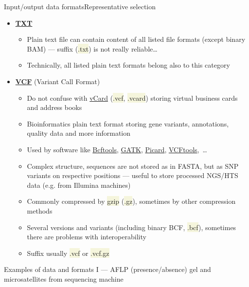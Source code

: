 \documentclass[compress, ucs, xelatex, 11pt, xcolor=svgnames, aspectratio=169,
	hyperref={
		bookmarks=true,
		unicode=true,
		colorlinks=true,
		pdftitle={Molecular data in R},
		plainpages=false,
		pdfauthor={Vojtech Zeisek},
		pdfsubject={Course about phylogeny and evolution in R},
		pdfcreator={XeLaTeX},
		pdfkeywords={R, evolution, phylogeny, molecular data},
		linkcolor=Crimson, %
		anchorcolor=Magenta, %
		citecolor=Magenta, %
		filecolor=Magenta, %
		menucolor=Magenta, %
		urlcolor=DodgerBlue, %
		pdftex},
	url={hyphens, lowtilde} %
	]{beamer}
\renewcommand{\texttt}[1]{\colorbox{Beige}{{\ttfamily #1}}}
\begin{document}
\begin{frame}[allowframebreaks]{Input/output data formats}{Representative selection}
\begin{itemize}
		\item \href{https://en.wikipedia.org/wiki/Text_file}{\textbf{TXT}}
		\begin{itemize}
			\item Plain text file can contain content of all listed file formats (except binary BAM) --- suffix (\texttt{*.txt}) is not really reliable\ldots
			\item Technically, all listed plain text formats belong also to this category
		\end{itemize}
		\item \href{https://en.wikipedia.org/wiki/Variant_Call_Format}{\textbf{VCF}} (Variant Call Format)
		\begin{itemize}
			\item Do not confuse with \href{https://en.wikipedia.org/wiki/VCard}{vCard} (\texttt{*.vcf}, \texttt{*.vcard}) storing virtual business cards and address books
			\item Bioinformatics plain text format storing gene variants, annotations, quality data and more information
			\item Used by software like \href{https://samtools.github.io/bcftools/}{Bcftools}, \href{https://gatk.broadinstitute.org/hc/en-us}{GATK}, \href{https://broadinstitute.github.io/picard/}{Picard}, \href{https://vcftools.github.io/}{VCFtools},~\ldots
			\item Complex structure, sequences are not stored as in FASTA, but as SNP variants on respective positions --- useful to store processed NGS/HTS data (e.g. from Illumina machines)
			\item Commonly compressed by \texttt{gzip} (\texttt{*.gz}), sometimes by other compression methods
			\item Several versions and variants (including binary BCF, \texttt{*.bcf}), sometimes there are problems with interoperability
			\item Suffix usually \texttt{*.vcf} or \texttt{*.vcf.gz}
		\end{itemize}
	\end{itemize}
\end{frame}

\begin{frame}{Examples of data and formats I --- AFLP (presence/absence) gel and microsatellites from sequencing machine}
	\begin{center}
		\texttt{[image: aflp\_ssrs.png]}
	\end{center}
\end{frame}
\end{document}
